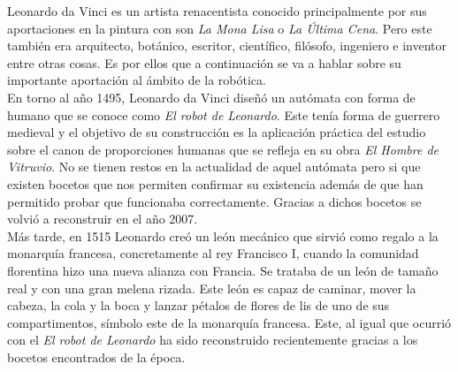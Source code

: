 Leonardo da Vinci es un artista renacentista conocido principalmente por sus aportaciones en la pintura con son \textit{La Mona Lisa} o \textit{La Última Cena}. Pero este también era arquitecto, botánico, escritor, científico, filósofo, ingeniero e inventor entre otras cosas. Es por ellos que a continuación se va a hablar sobre su importante aportación al ámbito de la robótica.\\

En torno al año 1495, Leonardo da Vinci diseñó un autómata con forma de humano que se conoce como \textit{El robot de Leonardo}. Este tenía forma de guerrero medieval y el objetivo de su construcción es la aplicación práctica del estudio sobre el canon de proporciones humanas que se refleja en su obra \textit{El Hombre de Vitruvio}. No se tienen restos en la actualidad de aquel autómata pero si que existen bocetos que nos permiten confirmar su existencia además de que han permitido probar que funcionaba correctamente. Gracias a dichos bocetos se volvió a reconstruir en el año 2007.\\

Más tarde, en 1515 Leonardo creó un león mecánico que sirvió como regalo a la monarquía francesa, concretamente al rey Francisco I, cuando la comunidad florentina hizo una nueva alianza con Francia. Se trataba de un león de tamaño real y con una gran melena rizada. Este león es capaz de caminar, mover la cabeza, la cola y la boca y lanzar pétalos de flores de lis de uno de sus compartimentos, símbolo este de la monarquía francesa. Este, al igual que ocurrió con el \textit{El robot de Leonardo} ha sido reconstruido recientemente gracias a los bocetos encontrados de la época.
